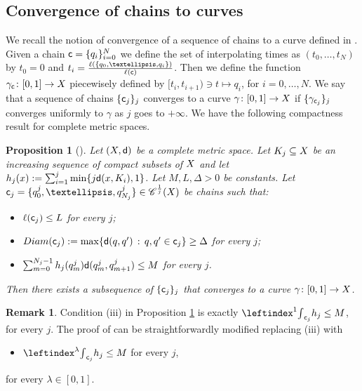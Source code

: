 \documentclass[12pt]{amsart}
\newcommand{\sfd}{{\sf d}}
\newcommand{\X}{{\rm X}}
\newtheorem{proposition}[theorem]{Proposition}
\theoremstyle{definition}
\newtheorem{remark}[theorem]{Remark}
\newcommand{\sfc}{{\sf c}}
\newcommand{\Chain}[1]{\mathscr{C}^{#1}}
\begin{document}
\subsection{Convergence of chains to curves}
We recall the notion of convergence of a sequence of chains to a curve defined in \cite{Eriksson-Bique-Density-in-energy}. Given a chain $\sfc = \{q_i\}_{i=0}^N$ we define the set of interpolating times as $(t_0, \ldots, t_N)$ by $t_0 = 0$ and $t_i = \frac{\ell(\{q_0,\ldots,q_i\})}{\ell(\sfc)}$. Then we define the function $\gamma_{\sfc}\colon [0,1] \to \X$ piecewisely defined by $[t_i,t_{i+1}) \ni t \mapsto q_i$, for $i=0,\ldots,N$. We say that a sequence of chains $\{\sfc_j\}_j$ converges to a curve $\gamma \colon [0,1] \to \X$ if $\{\gamma_{\sfc_j}\}_j$ converges uniformly to $\gamma$ as $j$ goes to $+\infty$. We have the following compactness result for complete metric spaces.
    \begin{proposition}[{\cite[Lemma 2.18]{Eriksson-Bique-Density-in-energy}}]
    \label{prop:Sylvester_compactness_chains}
    Let $(\X,\sfd)$ be a complete metric space. Let $K_j \subseteq \X$ be an increasing sequence of compact subsets of $\X$ and let $h_j(x):= \sum_{i=1}^j \min\{ j\sfd(x,K_i),1\}$. Let $M,L,\Delta > 0$ be constants. Let $\sfc_j = \{q_0^j,\ldots,q_{N_j}^j\} \in \Chain{\frac{1}{j}}(\X)$ be chains such that:
    \begin{itemize}
        \item[(i)] $\ell(\sfc_j) \le L$ for every $j$;
        \item[(ii)] ${\rm Diam}(\sfc_j) := \max\{ \sfd(q,q') \, : \, q,q'\in \sfc_j\} \ge \Delta$ for every $j$;
        \item[(iii)] $\sum_{m=0}^{N_j-1} h_j(q_m^j)\sfd(q_m^j,q_{m+1}^j) \le M$ for every $j$.
    \end{itemize}
    Then there exists a subsequence of $\{\sfc_j\}_j$ that converges to a curve $\gamma \colon [0,1] \to \X$. 
\end{proposition}

\begin{remark}
    \label{rmk:compactness_chains_with_lambda}
    Condition (iii) in Proposition \ref{prop:Sylvester_compactness_chains} is exactly $\leftindex^1{\int}_{\sfc_j} h_j \le M$, for every $j$. The proof of \cite[Lemma 2.18]{Eriksson-Bique-Density-in-energy} can be straightforwardly modified replacing (iii) with
    \begin{itemize}
        \item[(iii)$_\lambda$] $\leftindex^\lambda{\int}_{\sfc_j} h_j \le M$ for every $j$,
    \end{itemize}
    for every $\lambda \in [0,1]$.
\end{remark}
\end{document}
